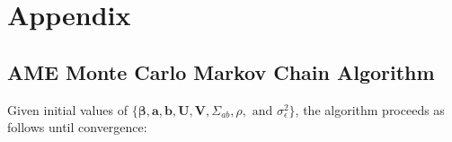 \clearpage

\renewcommand{\thefigure}{A\arabic{figure}}
\setcounter{figure}{0}
\renewcommand{\thetable}{A.\arabic{table}}
\setcounter{table}{0}
\renewcommand{\thesection}{A.\arabic{section}}
\setcounter{section}{0}

\section*{\textbf{Appendix}}

\subsection*{AME Monte Carlo Markov Chain Algorithm}

Given initial values of $\{\bm\beta, \mathbf{a}, \mathbf{b}, \mathbf{U}, \mathbf{V}, \Sigma_{ab}, \rho, \text{ and } \sigma_{\epsilon}^{2}\}$, the algorithm proceeds as follows until convergence:

